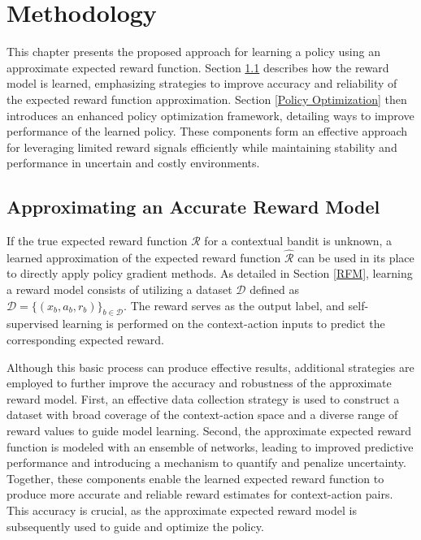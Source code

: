 \documentclass[./dissertation.tex]{subfiles}
\begin{document}
\chapter{Methodology}
This chapter presents the proposed approach for learning a policy using an approximate expected reward function. Section \ref{Approximating an Accurate Reward Model} describes how the reward model is learned, emphasizing strategies to improve accuracy and reliability of the expected reward function approximation. Section \ref{Policy Optimization} then introduces an enhanced policy optimization framework, detailing ways to improve performance of the learned policy. These components form an effective approach for leveraging limited reward signals efficiently while maintaining stability and performance in uncertain and costly environments.

\section{Approximating an Accurate Reward Model}
\label{Approximating an Accurate Reward Model}
If the true expected reward function $\mathcal{R}$ for a contextual bandit is unknown, a learned approximation of the expected reward function $\hat{\mathcal{R}}$ can be used in its place to directly apply policy gradient methods. As detailed in Section \ref{RFM}, learning a reward model consists of utilizing a dataset $\mathcal{D}$ defined as $\mathcal{D}=\{(x_b,a_b,r_b)\}_{b \in \mathcal{D}}$. The reward serves as the output label, and self-supervised learning is performed on the context-action inputs to predict the corresponding expected reward. 

Although this basic process can produce effective results, additional strategies are employed to further improve the accuracy and robustness of the approximate reward model. First, an effective data collection strategy is used to construct a dataset with broad coverage of the context-action space and a diverse range of reward values to guide model learning. Second, the approximate expected reward function is modeled with an ensemble of networks, leading to improved predictive performance and introducing a mechanism to quantify and penalize uncertainty. Together, these components enable the learned expected reward function to produce more accurate and reliable reward estimates for context-action pairs. This accuracy is crucial, as the approximate expected reward model is subsequently used to guide and optimize the policy.
\end{document}
